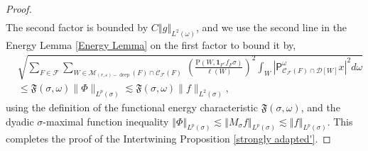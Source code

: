 \documentclass[10pt,a4paper]{amsart}
\begin{document}
\begin{proof}
\begin{align*}
\end{align*}
The second factor is bounded by $C\left\Vert g\right\Vert _{L^{2}\left(
\omega\right)  }$, and we use the second line in the Energy Lemma
\ref{Energy Lemma} on the first factor to bound it by,%
\begin{align}
& \sqrt{\sum_{F\in\mathcal{F}}\sum_{W\in\mathcal{M}_{\left(  r,\varepsilon
\right)  -\operatorname*{deep}}\left(  F\right)  \cap\mathcal{C}_{\mathcal{F}%
}\left(  F\right)  }\ \left(  \frac{\mathrm{P}\left(  W,\mathbf{1}_{F^{c}%
}f_{F}\sigma\right)  }{\ell\left(  W\right)  }\right)  ^{2}\int_{W}\left\vert
\mathsf{P}_{\mathcal{C}_{\mathcal{F}}\left(  F\right)  \cap\mathcal{D}\left[
W\right]  }^{\omega}x\right\vert ^{2}d\omega}\label{bound by}\\
& \leq\mathfrak{F}\left(  \sigma,\omega\right)  \lVert\Phi\rVert_{L^{p}\left(
\sigma\right)  }\lesssim\mathfrak{F}\left(  \sigma,\omega\right)  \lVert
f\rVert_{L^{2}\left(  \sigma\right)  },\nonumber
\end{align}
using the definition of the functional energy characteristic $\mathfrak{F}%
\left(  \sigma,\omega\right)  $, and the dyadic $\sigma$-maximal function
inequality $\left\Vert \Phi\right\Vert _{L^{p}\left(  \sigma\right)  }%
\lesssim\left\Vert M_{\sigma}f\right\Vert _{L^{p}\left(  \sigma\right)
}\lesssim\left\Vert f\right\Vert _{L^{p}\left(  \sigma\right)  }$. This
completes the proof of the Intertwining Proposition \ref{strongly adapted'}.
\end{proof}
\end{document}

